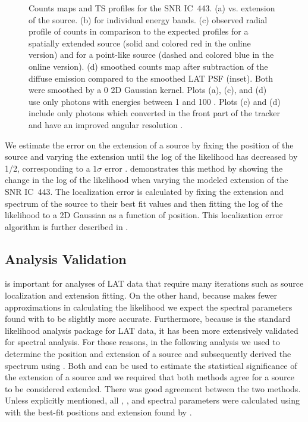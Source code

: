 \begin{figure}[htbp]
    \fi
    \caption{
    Counts maps and TS profiles for the SNR IC~443. (a) \ts
    vs. extension of the source. (b) \tsext for individual energy
    bands. (c) observed radial profile of counts in comparison to the
    expected profiles for a spatially extended source (solid and colored
    red in the online version) and for a point-like source (dashed and colored
    blue in the online version).  (d) smoothed counts map after subtraction
    of the diffuse emission compared to the smoothed
    LAT PSF (inset). Both were smoothed by a 0 2D Gaussian kernel.
    Plots (a),
    (c), and (d) use only 
    photons with energies between
    1 \gev and 100 \gev.  Plots (c) and (d) include
    only photons which converted in the front part of the tracker and
    have an improved angular resolution \citep{atwood_2009a_large-telescope}.
    }
\end{figure}


We estimate the error on the extension of a source by fixing
the position of the source and varying the extension until the
log of the likelihood has decreased by 1/2, corresponding to a $1\sigma$ error
\citep{eadie_1971a_statistical-methods}.  
demonstrates this method by showing the change in the log of the
likelihood when 
varying the modeled extension of the SNR IC~443.  The localization
error is calculated by fixing the extension and spectrum of the source
to their best fit values and then
fitting the log of the likelihood to
a 2D Gaussian as a function
of position. This localization error algorithm is further described in
\cite{nolan_2012_fermi-large}.

\subsection{\gtlike Analysis Validation}

\pointlike is important for analyses of LAT data that require many iterations
such as source localization and extension fitting.  On the other hand,
because \gtlike makes fewer approximations in calculating the likelihood
we expect the spectral parameters found with \gtlike to be slightly more
accurate.  Furthermore, because \gtlike is the 
standard likelihood analysis package for LAT data, 
it has been more extensively validated for spectral analysis.
For those reasons, in the following analysis we used \pointlike to
determine the position and extension of a source and subsequently derived
the spectrum using \gtlike. Both \gtlike and \pointlike can be used to
estimate the statistical significance of the extension of a source and we
required that both methods agree for a source to be considered extended.
There was good agreement between the two methods.  Unless explicitly
mentioned, all \ts, \tsext, and spectral parameters were calculated using
\gtlike with the best-fit positions and extension found by \pointlike.


